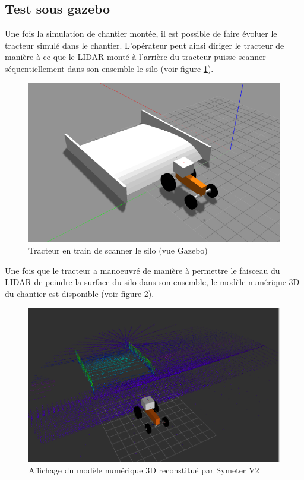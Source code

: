 \documentclass[12pt,a4paper]{report}
\begin{document}
	
		\subsection{Test sous gazebo}
		Une fois la simulation de chantier montée, il est possible de faire évoluer le tracteur simulé dans le chantier. L'opérateur peut ainsi diriger le tracteur de manière à ce que le LIDAR monté à l'arrière du tracteur puisse scanner séquentiellement dans son ensemble le silo (voir figure \ref{fig:tracteurfinscan}).
		
		\begin{figure}[h!]
			\centering
			\includegraphics[width=0.7\linewidth]{img/tracteurfinscan}
			\caption[tracteurfinscan]{Tracteur en train de scanner le silo (vue Gazebo)}
			\label{fig:tracteurfinscan}
		\end{figure}
		
		Une fois que le tracteur a manoeuvré de manière à permettre le  faisceau du LIDAR de peindre la surface du silo dans son ensemble, le modèle numérique 3D du chantier est disponible (voir figure \ref{fig:scanchantier}).
		
		\begin{figure}
			\centering
			\includegraphics[width=1\linewidth]{img/scanchantier}
			\caption[modelnum]{Affichage du modèle numérique 3D reconstitué par Symeter V2}
			\label{fig:scanchantier}
		\end{figure}
		
\end{document}

